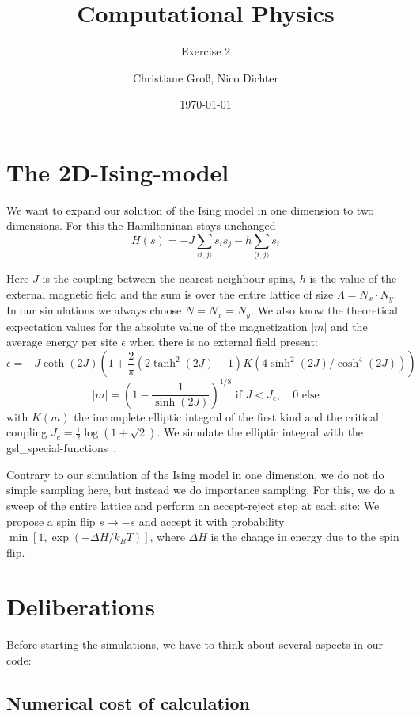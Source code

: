 \documentclass{scrartcl}
\title{Computational Physics}
\subtitle{Exercise 2}
\date{\today}
\author{Christiane Groß, Nico Dichter}
\begin{document}
	\maketitle
\section{The 2D-Ising-model}
We want to expand our solution of the Ising model in one dimension to two dimensions. For this the Hamiltoninan stays unchanged 
\begin{equation}
H(s)=-J\sum_{\langle i,j\rangle }s_is_j-h\sum_{\langle i,j\rangle }s_i
\label{eq:hamiltonianising}
\end{equation}

Here $J$ is the coupling between the nearest-neighbour-spins, $h$ is the value of the external magnetic field and the sum is over the entire lattice of size $\Lambda=N_x \cdot N_y$. In our simulations we always choose $N=N_x=N_y$.
We also know the theoretical expectation values for the  absolute value of the magnetization $|m|$ and the average energy per site $\epsilon$ when there is no external field present:
\begin{equation}
\epsilon=-J\coth(2J)\left( 1+\frac{2}{\pi}(2\tanh^2(2J)-1)K(4\sinh^2(2J)/\cosh^4(2J))\right) 
\end{equation}
\begin{equation}
|m|=\left( 1-\frac{1}{\sinh(2J)}\right)^{1/8} \text{ if } J<J_c,\quad 0 \text{ else}   
\end{equation}
 with $K(m)$ the incomplete elliptic integral of the first kind and the critical coupling $J_c=\frac{1}{2}\log(1+\sqrt{2})$. We simulate the elliptic integral with the gsl\_special-functions~\cite{gsldoc_sf}.
 
 Contrary to our simulation of the Ising model in one dimension, we do not do simple sampling here, but instead we do importance sampling. For this, we do a sweep of the entire lattice and perform an accept-reject step at each site: We propose a spin flip $s\rightarrow-s$ and accept it with probability $\min \left[1, \exp(-\Delta H/k_BT)\right]$, where $\Delta H$ is the change in energy due to the spin flip.  

\section{Deliberations}
Before starting the simulations, we have to think about several aspects in our code:
\subsection{Numerical cost of calculation}
\end{document}
